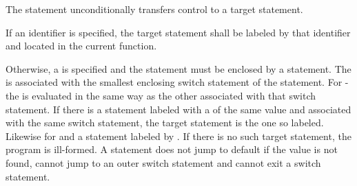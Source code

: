 \documentclass[ebook,10pt,oneside,openany,final]{memoir}
\begin{document}
\begin{shaded}

\pnum
The  statement unconditionally transfers control to a target statement.

\pnum
If an identifier is specified, the target statement shall be labeled by that identifier and located in the current function.

\pnum
Otherwise, a  is specified and the  statement must be enclosed by a  statement.  The  is associated with the smallest enclosing switch statement of the  statement.  For   - the  is evaluated in the same way as the other  associated with that switch statement.  If there is a statement labeled with a  of the same value and associated with the same switch statement, the target statement is the one so labeled.  Likewise for  and a statement labeled by .  If there is no such target statement, the program is ill-formed. \enternote A  statement does not jump to default if the value is not found, cannot jump to an outer switch statement and cannot exit a switch statement. \exitnote

\end{shaded}
\end{document}
